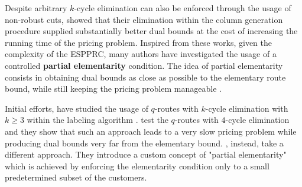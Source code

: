 \medskip

Despite arbitrary $k$-cycle elimination can also
be enforced through the usage of non-robust cuts,
\citeauthor{feillet2004} showed that their elimination
within the column generation procedure supplied
substantially better dual bounds at the cost
of increasing the running time of the pricing problem.
Inspired from these works, given the complexity
of the ESPPRC, many authors have investigated the usage
of a controlled \textbf{partial elementarity} condition.
The idea of partial elementarity consists in obtaining
dual bounds as close as possible to the elementary route bound,
while still keeping the pricing problem manageable \parencite{contardo2015}.

Initial efforts, have studied the usage of $q$-routes with
$k$-cycle elimination with $k \ge 3$ within the labeling algorithm \parencite{irnich2006, fukasawa2006}.
\textcite{fukasawa2006} test the $q$-routes with $4$-cycle elimination
and they show that such an approach leads
to a very slow pricing problem while
producing dual bounds very far from the elementary bound.
\textcite{desaulniers2008}, instead, take a different approach.
They introduce a custom concept of "partial elementarity"
which is achieved by enforcing the elementarity condition
only to a small predetermined subset of the customers.

